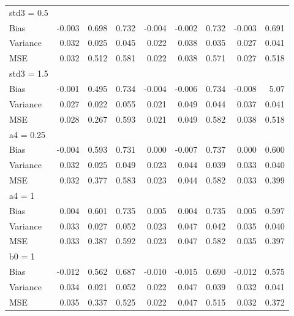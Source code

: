 \documentclass[10,a4paperpaper,]{article}
\begin{document}
\begin{table}
\begin{tabular}{l r r r r r r r r}
std3 = 0.5\\
Bias & -0.003 & 0.698 & 0.732 & -0.004 & -0.002 & 0.732 & -0.003 & 0.691\\

Variance & 0.032 & 0.025 & 0.045 & 0.022 & 0.038 & 0.035 & 0.027 & 0.041\\

MSE & 0.032 & 0.512 & 0.581 & 0.022 & 0.038 & 0.571 & 0.027 & 0.518\\

std3 = 1.5\\
Bias & -0.001 & 0.495 & 0.734 & -0.004 & -0.006 & 0.734 & -0.008 & 5.07\\

Variance & 0.027 & 0.022 & 0.055 & 0.021 & 0.049 & 0.044 & 0.037 & 0.041\\

MSE & 0.028 & 0.267 & 0.593 & 0.021 & 0.049 & 0.582 & 0.038 & 0.518\\

a4 = 0.25\\
Bias & -0.004 & 0.593 & 0.731 & 0.000 & -0.007 & 0.737 & 0.000 & 0.600\\

Variance & 0.032 & 0.025 & 0.049 & 0.023 & 0.044 & 0.039 & 0.033 & 0.040\\

MSE & 0.032 & 0.377 & 0.583 & 0.023 & 0.044 & 0.582 & 0.033 & 0.399\\

a4 = 1\\
Bias & 0.004 & 0.601 & 0.735 & 0.005 & 0.004 & 0.735 & 0.005 & 0.597\\

Variance & 0.033 & 0.027 & 0.052 & 0.023 & 0.047 & 0.042 & 0.035 & 0.040\\

MSE & 0.033 & 0.387 & 0.592 & 0.023 & 0.047 & 0.582 & 0.035 & 0.397\\

b0 = 1\\
Bias & -0.012 & 0.562 & 0.687 & -0.010 & -0.015 & 0.690 & -0.012 & 0.575\\

Variance & 0.034 & 0.021 & 0.052 & 0.022 & 0.047 & 0.039 & 0.032 & 0.041\\

MSE & 0.035 & 0.337 & 0.525 & 0.022 & 0.047 & 0.515 & 0.032 & 0.372\\
\hline
\end{tabular}
\end{table}
\end{document}
